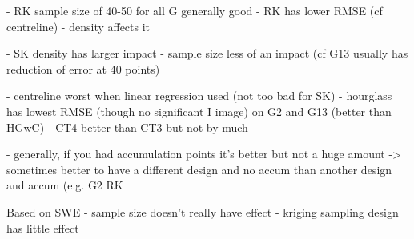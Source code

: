 \documentclass[12pt]{article}
\begin{document}
- RK sample size of 40-50 for all G generally good
- RK has lower RMSE (cf centreline)
- density affects it

- SK density has larger impact 
- sample size less of an impact (cf G13 usually has reduction of error at 40 points)

- centreline worst when linear regression used (not too bad for SK)
- hourglass has lowest RMSE (though no significant I image) on G2 and G13 (better than HGwC)
- CT4 better than CT3 but not by much

- generally, if you had accumulation points it's better but not a huge amount -> sometimes better to have a different design and no accum than another design and accum (e.g. G2 RK 

Based on SWE
- sample size doesn't really have effect
- kriging sampling design has little effect



\end{document}
